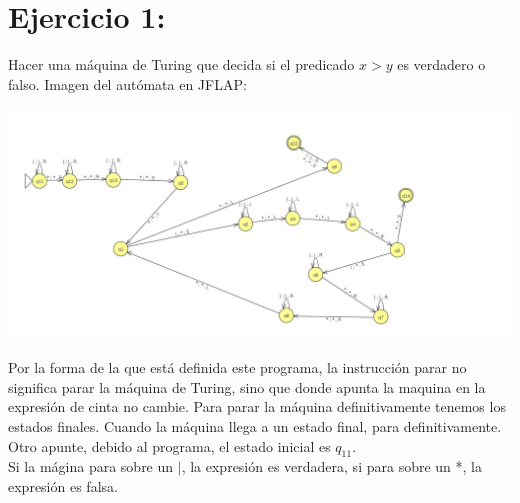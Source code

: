 \documentclass[12pt]{article}
\author{David }
\begin{document}
\section*{Ejercicio 1: }
Hacer una máquina de Turing que decida si el predicado $x>y$ es verdadero o falso. Imagen del autómata en JFLAP:
\begin{center}
    \includegraphics[width=20cm]{TM.jpg}
\end{center}
Por la forma de la que está definida este programa, la instrucción parar no significa parar la máquina de Turing, sino que donde apunta la maquina en la expresión de cinta no cambie. Para parar la máquina definitivamente tenemos los estados finales. Cuando la máquina llega a un estado final, para definitivamente. Otro apunte, debido al programa, el estado inicial es $q_{11}$.\\
Si la mágina para sobre un $|$, la expresión es verdadera, si para sobre un *, la expresión es falsa.
\end{document}
